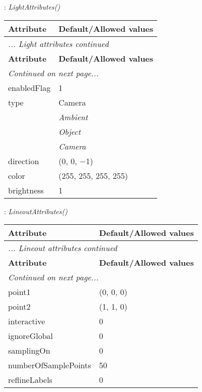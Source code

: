 \documentclass[10pt,a4paper]{report}
\begin{document}
\newpage

{}
: {\it LightAttributes() }\\[-3mm]

\begin{longtable}{ll}
{\bf Attribute} & {\bf Default/Allowed values} \\
\hline \hline
\endfirsthead
\multicolumn{2}{l}{{\it ... Light attributes continued}} \\
{\bf Attribute} & {\bf Default/Allowed values} \\
\hline \hline
\endhead
\hline
\multicolumn{2}{l}{{\it Continued on next page...}} \\
\endfoot
\hline
\endlastfoot

enabledFlag  &  1 \\
type  &  Camera   \\
 & {\it  Ambient} \\
 & {\it  Object} \\
 & {\it  Camera} \\
direction  &  (0, 0, $-$1) \\
color  &  (255, 255, 255, 255) \\
brightness  &  1 \\
\end{longtable}

\newpage

{}
: {\it LineoutAttributes() }\\[-3mm]

\begin{longtable}{ll}
{\bf Attribute} & {\bf Default/Allowed values} \\
\hline \hline
\endfirsthead
\multicolumn{2}{l}{{\it ... Lineout attributes continued}} \\
{\bf Attribute} & {\bf Default/Allowed values} \\
\hline \hline
\endhead
\hline
\multicolumn{2}{l}{{\it Continued on next page...}} \\
\endfoot
\hline
\endlastfoot

point1  &  (0, 0, 0) \\
point2  &  (1, 1, 0) \\
interactive  &  0 \\
ignoreGlobal  &  0 \\
samplingOn  &  0 \\
numberOfSamplePoints  &  50 \\
reflineLabels  &  0 \\
\end{longtable}
\end{document}
